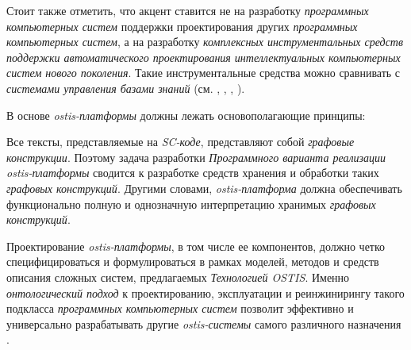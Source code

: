 Стоит также отметить, что акцент ставится не на разработку \textit{программных компьютерных систем} поддержки проектирования других \textit{программных компьютерных систем}, а на разработку \textit{комплексных инструментальных средств поддержки автоматического проектирования интеллектуальных компьютерных систем нового поколения}. Такие инструментальные средства можно сравнивать с \textit{системами управления базами знаний} (см. , , , ).

В основе \textit{ostis-платформы} должны лежать основополагающие принципы:
\begin{textitemize}
    \item Все тексты, представляемые на \textit{SC-коде}, представляют собой \textit{графовые конструкции}. Поэтому задача разработки \textit{Программного варианта реализации ostis-платформы} сводится к разработке средств хранения и обработки таких \textit{графовых конструкций}. Другими словами, \textit{ostis-платформа} должна обеспечивать функционально полную и однозначную интерпретацию хранимых \textit{графовых конструкций}.
    \item Проектирование \textit{ostis-платформы}, в том числе ее компонентов, должно четко специфицироваться и формулироваться в рамках моделей, методов и средств описания сложных систем, предлагаемых \textit{Технологией OSTIS}. Именно \textit{онтологический подход} к проектированию, эксплуатации и реинжинирингу такого подкласса \textit{программных компьютерных систем} позволит эффективно и универсально разрабатывать другие \textit{ostis-системы} самого различного назначения .
\end{textitemize}

